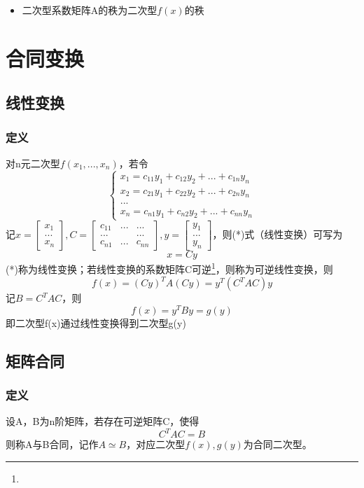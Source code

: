 \begin{itemize}
    \item 二次型系数矩阵A的秩为二次型\(f(x)\)的秩
\end{itemize}


\section{合同变换}

\subsection{线性变换}

\subsubsection{定义}

对n元二次型\(f(x_1, ..., x_n)\)，若令
\[\begin{cases}
    x_1 = c_{11}y_1 + c_{12}y_2 + ... + c_{1n}y_n \\ 
    x_2 = c_{21}y_1 + c_{22}y_2 + ... + c_{2n}y_n \\ 
    ... \\ 
    x_n = c_{n1}y_1 + c_{n2}y_2 + ... + c_{nn}y_n
\end{cases}\tag{*}\]
记\(x = \begin{bmatrix}
    x_1 \\ 
    ... \\ 
    x_n
\end{bmatrix}, C = \begin{bmatrix}
    c_{11} & ... & ... \\ 
    ... & & ... \\ 
    c_{n1} & ... & c_{nn}
\end{bmatrix}, y = \begin{bmatrix}
    y_1 \\ 
    ... \\ 
    y_n
\end{bmatrix}\)，则(*)式（线性变换）可写为\[x = Cy\]
(*)称为线性变换；若线性变换的系数矩阵C可逆\footnote{\mymatrix}，则称为可逆线性变换，则\[f(x) = (Cy)^TA(Cy) = y^T(C^TAC)y\]
记\(B = C^TAC\)，则\[f(x) = y^TBy = g(y)\]
即二次型f(x)通过线性变换得到二次型g(y)


\subsection{矩阵合同}

\subsubsection{定义}
设A，B为n阶矩阵，若存在可逆矩阵C，使得\[C^TAC = B\]
则称A与B合同，记作\(A \simeq B\)，对应二次型\(f(x), g(y)\)为合同二次型。

